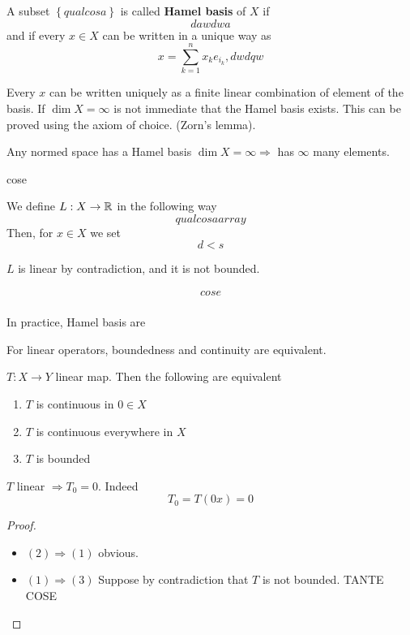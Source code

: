 \begin{definition}
    A subset \(\left\{ qualcosa \right\}\) is called \textbf{Hamel basis} of \(X\) if 
    \[
        dawdwa
    \]
    and if every \(x \in X\) can be written in a unique way as 
    \[
        x = \sum_{k=1}^n x_k e_{i_k}, dwdqw
    \]
\end{definition}
Every \(x\) can be written uniquely as a finite linear combination of element of the basis.
If \(\dim X = \infty\) is not immediate that the Hamel basis exists. This can be proved using the axiom of choice. (Zorn's lemma). 

Any normed space has a Hamel basis \(\dim X = \infty \Rightarrow \) has \(\infty\) many elements.

cose

We define \(L:X \to \mathbb{R}\) in the following way 
\[
    qualcosa array
\]
Then, for \(x \in X\) we set
\[
d<s    
\]
 
\(L\) is linear by contradiction, and it is not bounded.

\[
    \begin{array}{c}
        cose \\
    \end{array}
\]
\begin{remark}
    In practice, Hamel basis are 
\end{remark}
For linear operators, boundedness and continuity are equivalent.
\begin{theorem}
    \(T:X \to Y\) linear map. Then the following are equivalent
    \begin{enumerate}
        \item \(T\) is continuous in \(0 \in X\)
        \item \(T\) is continuous everywhere in \(X\)
        \item \(T\) is bounded
    \end{enumerate}
\end{theorem}
\begin{remark}
    \(T\) linear \(\Rightarrow T_0 = 0\). Indeed
    \[
        T_0 = T(0x) =  0
    \]
\end{remark}
\begin{proof}
    
    \begin{itemize}
        \item \((2) \Rightarrow (1)\) obvious.
        \item \((1) \Rightarrow (3)\) Suppose by contradiction that \(T\) is not bounded. TANTE COSE
    \end{itemize}
\end{proof}